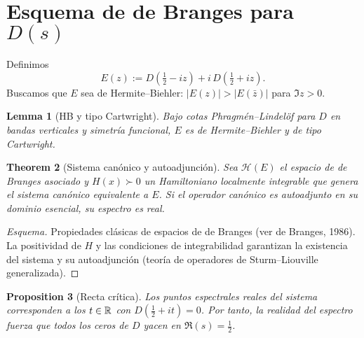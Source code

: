 \section{Esquema de de Branges para $D(s)$}

\newtheorem{theoremC}{Theorem}[section]
\newtheorem{lemmaC}[theoremC]{Lemma}
\newtheorem{propC}[theoremC]{Proposition}

Definimos
\[
E(z):=D\!\left(\tfrac{1}{2}-iz\right)+i\,D\!\left(\tfrac{1}{2}+iz\right).
\]
Buscamos que $E$ sea de Hermite--Biehler: $|E(z)|>|E(\bar z)|$ para $\Im z>0$.

\begin{lemmaC}[HB y tipo Cartwright]
Bajo cotas Phragmén--Lindelöf para $D$ en bandas verticales y simetría funcional,
$E$ es de Hermite--Biehler y de tipo Cartwright.
\end{lemmaC}

\begin{theoremC}[Sistema canónico y autoadjunción]
Sea $\mathcal{H}(E)$ el espacio de de Branges asociado y $H(x)\succ 0$ un Hamiltoniano
localmente integrable que genera el sistema canónico equivalente a $E$.
Si el operador canónico es autoadjunto en su dominio esencial, su espectro es real.
\end{theoremC}

\begin{proof}[Esquema]
Propiedades clásicas de espacios de de Branges (ver de Branges, 1986).
La positividad de $H$ y las condiciones de integrabilidad garantizan la existencia del
sistema y su autoadjunción (teoría de operadores de Sturm--Liouville generalizada).
\end{proof}

\begin{propC}[Recta crítica]
Los puntos espectrales reales del sistema corresponden a los $t\in\Bbb R$ con
$D(\tfrac{1}{2}+it)=0$. Por tanto, la realidad del espectro fuerza que todos los ceros
de $D$ yacen en $\Re(s)=\tfrac{1}{2}$.
\end{propC}
